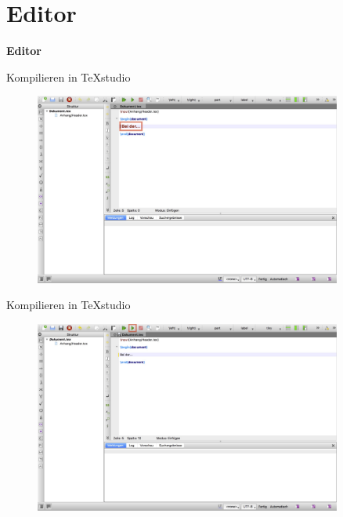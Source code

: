 %	
%
\section{Editor}
\begin{frame}[c]
	\begin{center}
		\LARGE \textbf{Editor}
	\end{center}
\end{frame}


\begin{frame}[c]{Kompilieren in TeXstudio}
	\begin{figure}[htbp]
\centering
\includegraphics[width=0.9\textwidth]{img/editor/1.jpg}
\end{figure}
\end{frame}


\begin{frame}[c]{Kompilieren in TeXstudio}
	\begin{figure}[htbp]
\centering
\includegraphics[width=0.9\textwidth]{img/editor/2.jpg}
\end{figure}
\end{frame}

